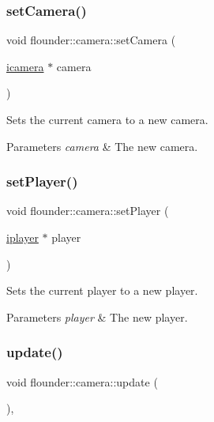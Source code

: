 \subsubsection{\texorpdfstring{set\+Camera()}{setCamera()}}
{\footnotesize\ttfamily void flounder\+::camera\+::set\+Camera (\begin{DoxyParamCaption}\item[{\hyperlink{classflounder_1_1icamera}{icamera} $\ast$}]{camera }\end{DoxyParamCaption})\hspace{0.3cm}{\ttfamily [inline]}}



Sets the current camera to a new camera. 


\begin{DoxyParams}{Parameters}
{\em camera} & The new camera. \\
\hline
\end{DoxyParams}
\mbox{\label{classflounder_1_1camera_aa572fb3c1428b8a69aba9e9944405c5c}} 
\subsubsection{\texorpdfstring{set\+Player()}{setPlayer()}}
{\footnotesize\ttfamily void flounder\+::camera\+::set\+Player (\begin{DoxyParamCaption}\item[{\hyperlink{classflounder_1_1iplayer}{iplayer} $\ast$}]{player }\end{DoxyParamCaption})\hspace{0.3cm}{\ttfamily [inline]}}



Sets the current player to a new player. 


\begin{DoxyParams}{Parameters}
{\em player} & The new player. \\
\hline
\end{DoxyParams}
\mbox{\label{classflounder_1_1camera_a6b2da3a1c348764d3cf954db5ac5b357}} 
\subsubsection{\texorpdfstring{update()}{update()}}
{\footnotesize\ttfamily void flounder\+::camera\+::update (\begin{DoxyParamCaption}{ }\end{DoxyParamCaption})\hspace{0.3cm}{\ttfamily [override]}, {\ttfamily [virtual]}}




